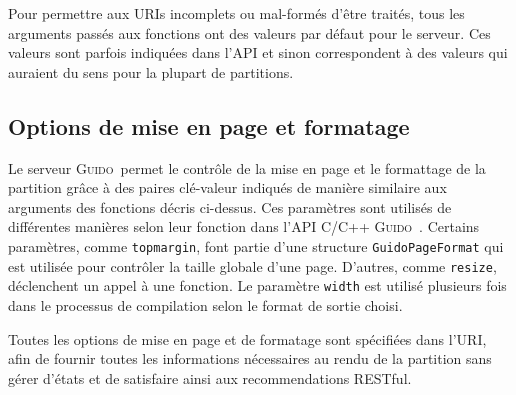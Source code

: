 \documentclass{article}
\newcommand{\guido}		{\textsc{Guido}}
\begin{document}
Pour permettre aux URIs incomplets ou mal-formés d'être traités, tous les arguments passés aux fonctions ont des valeurs par défaut pour le serveur. Ces valeurs sont parfois indiquées dans l'API et sinon correspondent à des valeurs qui auraient du sens pour la plupart de partitions.

\subsection{Options de mise en page et formatage}

Le serveur \guido\ permet le contrôle de la mise en page et le formattage de la partition grâce à des paires clé-valeur indiqués de manière similaire aux arguments des fonctions décris ci-dessus.
Ces paramètres sont utilisés de différentes manières selon leur fonction dans l'API C/C++ \guido\ . Certains paramètres, comme  \verb=topmargin=, font partie d'une structure \verb=GuidoPageFormat= qui est utilisée pour contrôler la taille globale d'une page. D'autres, comme \verb=resize=, déclenchent un appel à une fonction. Le paramètre \verb=width= est utilisé plusieurs fois dans le processus de compilation selon le format de sortie choisi. 

Toutes les options de mise en page et de formatage sont spécifiées dans l'URI, afin de fournir toutes les informations nécessaires au rendu de la partition sans gérer d'états et de satisfaire ainsi aux recommendations RESTful.
\end{document}
